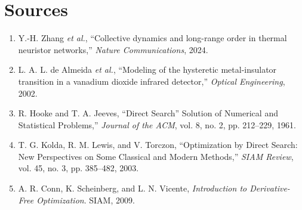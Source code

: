 \documentclass[11pt]{article}
\begin{document}
\section{Sources}
\begin{enumerate}
    \item Y.-H. Zhang \emph{et al.}, ``Collective dynamics and long-range order in thermal neuristor networks,'' \emph{Nature Communications}, 2024.
    \item L. A. L. de Almeida \emph{et al.}, ``Modeling of the hysteretic metal-insulator transition in a vanadium dioxide infrared detector,'' \emph{Optical Engineering}, 2002.
    \item R. Hooke and T. A. Jeeves, ``Direct Search'' Solution of Numerical and Statistical Problems,'' \emph{Journal of the ACM}, vol. 8, no. 2, pp. 212--229, 1961.
    \item T. G. Kolda, R. M. Lewis, and V. Torczon, ``Optimization by Direct Search: New Perspectives on Some Classical and Modern Methods,'' \emph{SIAM Review}, vol. 45, no. 3, pp. 385--482, 2003.
    \item A. R. Conn, K. Scheinberg, and L. N. Vicente, \emph{Introduction to Derivative-Free Optimization}. SIAM, 2009.
\end{enumerate}
\end{document}
